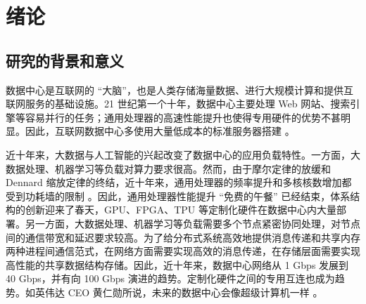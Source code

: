 \chapter{绪论}
\label{chapter:intro}

\section{研究的背景和意义}
\label{intro:sec:background}


数据中心是互联网的 ``大脑''，也是人类存储海量数据、进行大规模计算和提供互联网服务的基础设施。21 世纪第一个十年，数据中心主要处理 Web 网站、搜索引擎等容易并行的任务；通用处理器的高速性能提升也使得专用硬件的优势不甚明显。因此，互联网数据中心多使用大量低成本的标准服务器搭建 \cite{barroso2009datacenter}。

近十年来，大数据与人工智能的兴起改变了数据中心的应用负载特性。一方面，大数据处理、机器学习等负载对算力要求很高。然而，由于摩尔定律的放缓和 Dennard 缩放定律的终结，近十年来，通用处理器的频率提升和多核核数增加都受到功耗墙的限制 \cite{borkar2011future}。因此，通用处理器性能提升 ``免费的午餐'' 已经结束，体系结构的创新迎来了春天，GPU、FPGA、TPU \cite{jouppi2018motivation} 等定制化硬件在数据中心内大量部署。另一方面，大数据处理、机器学习等负载需要多个节点紧密协同处理，对节点间的通信带宽和延迟要求较高。为了给分布式系统高效地提供消息传递和共享内存两种进程间通信范式，在网络方面需要实现高效的消息传递，在存储层面需要实现高性能的共享数据结构存储。因此，近十年来，数据中心网络从 1 Gbps 发展到 40 Gbps，并有向 100 Gbps 演进的趋势。定制化硬件之间的专用互连也成为趋势。如英伟达 CEO 黄仁勋所说，未来的数据中心会像超级计算机一样 \cite{nvidia-datacenter}。


